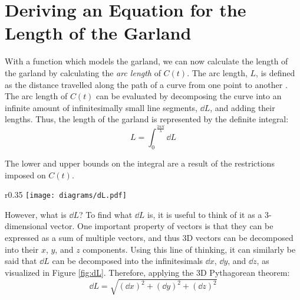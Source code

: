 \section*{Deriving an Equation for the Length of the Garland}

With a function which models the garland, we can now calculate the length of the garland by calculating the \emph{arc length} of $C(t)$. The arc length, $L$, is defined as the distance travelled along the path of a curve from one point to another \autocite{ArcLength2017}. The arc length of $C(t)$ can be evaluated by decomposing the curve into an infinite amount of infinitesimally small line segments, $\dd{L}$, and adding their lengths. Thus, the length of the garland is represented by the definite integral:
\begin{equation}
    L=\int_0^\frac{2\pi S}{\lambda} \dd{L} \label{eq:arclen}
\end{equation}

The lower and upper bounds on the integral are a result of the restrictions imposed on $C(t)$.

\begin{wrapfigure}{r}{0.35\textwidth}
    \centering
    \texttt{[image: diagrams/dL.pdf]}
    \caption{$\dd{L}$ in terms of $\dd{x}$, $\dd{y}$, and $\dd{z}$} \label{fig:dL}
\end{wrapfigure}
However, what is $\dd{L}$? To find what $\dd{L}$ is, it is useful to think of it as a 3-dimensional vector. One important property of vectors is that they can be expressed as a sum of multiple vectors, and thus 3D vectors can be decomposed into their $x$, $y$, and $z$  components. Using this line of thinking, it can similarly be said that $\dd{L}$ can be
decomposed into the infinitesimals $\dd{x}$, $\dd{y}$, and $\dd{z}$, as visualized in Figure \ref{fig:dL}. Therefore, applying the 3D Pythagorean theorem:
\begin{equation*}
    \dd{L} = \sqrt{(\dd{x})^2+(\dd{y})^2+(\dd{z})^2}
\end{equation*}

